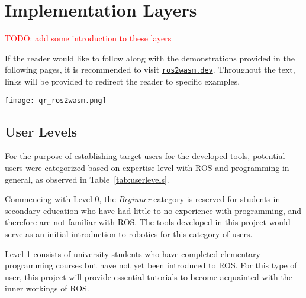 \section{Implementation Layers}

    \textcolor{red}{TODO: add some introduction to these layers} 




    \begin{tcolorbox}[title=Note]
        \begin{minipage}[t]{0.87\linewidth}
            \vspace*{0pt}
            If the reader would like to follow along with the demonstrations
            provided in the following pages, it is recommended to visit 
            \href{https://ros2wasm.dev/}{\texttt{ros2wasm.dev}}.
            Throughout the text, links will be provided to redirect the reader 
            to specific examples.
        \end{minipage}\hfill%
        \begin{minipage}[t]{0.1\linewidth}
            \vspace*{0pt}
            \texttt{[image: qr\_ros2wasm.png]}
        \end{minipage}
    \end{tcolorbox}


    \subsection{User Levels}

        For the purpose of establishing target users for the developed tools,
        potential users were categorized based on expertise level with \ac{ROS} 
        and programming in general, as observed in Table~\ref{tab:userlevels}.

        Commencing with Level 0, the \textit{Beginner} category is reserved for
        students in secondary education who have had little to no experience with
        programming, and therefore are not familiar with \ac{ROS}. The tools
        developed in this project would serve as an initial introduction to 
        robotics for this category of users.

        Level 1 consists of university students who have completed elementary 
        programming courses but have not yet been introduced to \ac{ROS}. For this
        type of user, this project will provide essential tutorials to become
        acquainted with the inner workings of \ac{ROS}.

